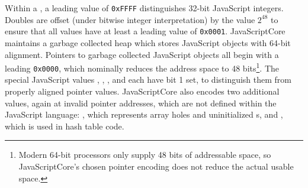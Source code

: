 Within a , a leading value of \texttt{0xFFFF} distinguishes 32-bit JavaScript integers.
Doubles are offset (under bitwise integer interpretation) by the value $2^{48}$ to ensure that all values have at least a leading value of \texttt{0x0001}.
JavaScriptCore maintains a garbage collected heap which stores JavaScript objects with 64-bit alignment.
Pointers to garbage collected JavaScript objects all begin with a leading \texttt{0x0000}, which nominally reduces the address space to 48 bits\footnote{Modern 64-bit processors only supply 48 bits of addressable space, so JavaScriptCore's chosen pointer encoding does not reduce the actual usable space.}.
The special JavaScript values , , , and  each have bit 1 set, to distinguish them from properly aligned pointer values.
JavaScriptCore also encodes two additional values, again at invalid pointer addresses, which are not defined within the JavaScript language: , which represents array holes and uninitialized s, and , which is used in hash table code.

\begin{comment}
   1  2   3      4
 0123456789abcdef
 0xffff ffff ffff ffff
    16   32        64

 signal nan:
 0x7ff0 0000 0000 0001 to
 0x7ff7 ffff ffff ffff
 or
 0xfff0 0000 0000 0001
 0xfff7 ffff ffff ffff

 quiet nan:
 0x7ff8 0000 0000 0001
 0x7fff ffff ffff ffff
 or
 0xfff8 0000 0000 0001
 0xffff ffff ffff ffff

 1 111 1 111 1 111 1---
 F     F     F     >8 

 E = 15 - 1 = 14 = 8 + 4 + 2
                   0111
                    - 1 // convert to actual double
                   0110 = 13
                   6

                   jsNan = 7ff8 0000 0000 0000
                           ffff                  tag type number
                           ----
                           true

                    jsNan -> asDouble
                    7ff8 0000 0000 0000
                -      1 0000 0000 0000       double encode offset
                   ---------------------
                    7ff7 0000 0000 0000       // now a signaling nan

\end{comment}

